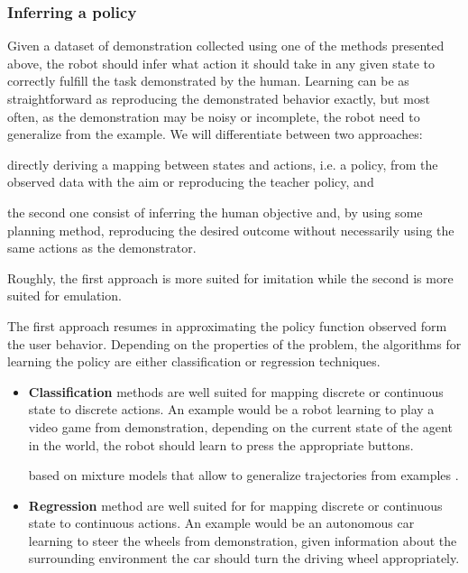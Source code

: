 \subsubsection*{Inferring a policy}

Given a dataset of demonstration collected using one of the methods presented above, the robot should infer what action it should take in any given state to correctly fulfill the task demonstrated by the human. Learning can be as straightforward as reproducing the demonstrated behavior exactly, but most often, as the demonstration may be noisy or incomplete, the robot need to generalize from the example. We will differentiate between two approaches: \begin{inparaenum}[(a)] \item directly deriving a mapping between states and actions, i.e. a policy, from the observed data with the aim or reproducing the teacher policy, and \item the second one consist of inferring the human objective and, by using some planning method, reproducing the desired outcome without necessarily using the same actions as the demonstrator. \end{inparaenum} Roughly, the first approach is more suited for imitation while the second is more suited for emulation. 

The first approach resumes in approximating the policy function observed form the user behavior. Depending on the properties of the problem, the algorithms for learning the policy are either classification or regression techniques. 

\begin{itemize}

\item \textbf{Classification} methods are well suited for mapping discrete or continuous state to discrete actions. An example would be a robot learning to play a video game from demonstration, depending on the current state of the agent in the world, the robot should learn to press the appropriate buttons.

based on mixture models that allow to generalize trajectories from examples \cite{calinon07}.


\item \textbf{Regression} method are well suited for for mapping discrete or continuous state to continuous actions. An example would be an autonomous car learning to steer the wheels from demonstration, given information about the surrounding environment the car should turn the driving wheel appropriately.


\end{itemize}

